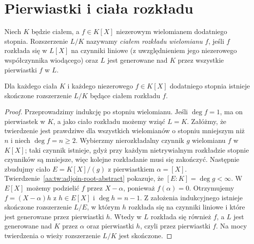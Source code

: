 \section{Pierwiastki i ciała rozkładu}
\begin{definicja}
\label{aa:def:splitting-field}
Niech $K$ będzie ciałem, a $f\in K[X]$ niezerowym wielomianem
dodatniego stopnia. Rozszerzenie $L/K$ nazywamy
\emph{ciałem rozkładu wielomianu $f$}, jeśli
$f$ rozkłada się w $L[X]$ na czynniki liniowe
(z uwzględnieniem jego niezerowego współczynnika wiodącego)
oraz $L$ jest generowane nad $K$ przez wszystkie
pierwiastki $f$ w $L$.
\end{definicja}

\begin{twierdzenie}
\label{aa:tw:splitting-existence}
Dla każdego ciała $K$ i każdego niezerowego
$f\in K[X]$ dodatniego stopnia istnieje skończone
rozszerzenie $L/K$ będące ciałem rozkładu $f$.
\end{twierdzenie}
\begin{proof}
Przeprowadzimy indukcję po stopniu wielomianu.
Jeśli $\deg f=1$, ma on pierwiastek w $K$,
a jako ciało rozkładu możemy wziąć $L=K$.
Załóżmy, że twierdzenie jest prawdziwe dla
wszystkich wielomianów o stopniu mniejszym niż
$n$ i niech $\deg f=n\ge2$.
Wybierzmy nierozkładalny czynnik $g$ wielomianu $f$
w $K[X]$; taki czynnik istnieje, gdyż przy każdym
nietrywialnym rozkładzie stopnie czynników są mniejsze,
więc kolejne rozkładanie musi się zakończyć. Następnie
zbudujmy ciało
$E=K[X]/(g)$ z pierwiastkiem $\alpha=[X]$.
Twierdzenie~\ref{aa:tw:adjoin-root-abstract}
pokazuje, że $[E:K]=\deg g<\infty$.
W $E[X]$ możemy podzielić $f$ przez $X-\alpha$,
ponieważ $f(\alpha)=0$. Otrzymujemy
$f=(X-\alpha)h$ z $h\in E[X]$ i
$\deg h=n-1$.
Z założenia indukcyjnego istnieje skończone
rozszerzenie $L/E$, w którym $h$ rozkłada się
na czynniki liniowe i które jest generowane przez
pierwiastki $h$. Wtedy w $L$ rozkłada się również
$f$, a $L$ jest generowane nad $K$ przez
$\alpha$ oraz pierwiastki $h$, czyli przez
pierwiastki $f$. Na mocy twierdzenia o wieży
rozszerzenie $L/K$ jest skończone.
\end{proof}

